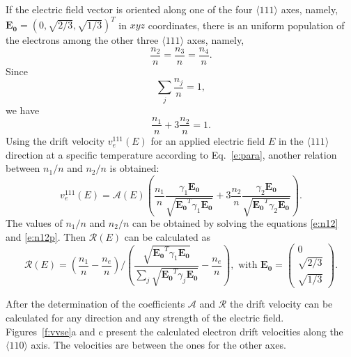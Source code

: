 \documentclass[epj]{svjour}
\begin{document}
If the electric field vector is oriented along one of the four
$\langle 111 \rangle$ axes, namely, $\mathbf{E_{0}} = (0, \sqrt{2/3},
\sqrt{1/3})^{T}$ in $xyz$ coordinates, there is an uniform population
of the electrons among the other three $\langle 111 \rangle$ axes,
namely,
\begin{equation} 
\label{e:n111} 
\frac{n_{2}}{n} = \frac{n_{3}}{n} = \frac{n_{4}}{n}. 
\end{equation} 
Since 
\begin{equation} 
\label{e:nsum} 
\displaystyle \sum_{j}\frac{n_{j}}{n} = 1, 
\end{equation} 
we have 
\begin{equation} 
\label{e:n12} 
\frac{n_{1}}{n} + 3\frac{n_{2}}{n}= 1. 
\end{equation} 
Using the drift velocity $v_{e}^{111}(E)$ for an applied electric
field $E$ in the $\langle 111 \rangle$ direction at a specific
temperature according to Eq.~\ref{e:para}, another relation between
$n_{1}/n$ and $n_{2}/n$ is obtained:
\begin{equation} 
\label{e:n12p} 
v_{e}^{111}(E) =  \mathcal{A}(E) 
\left( \frac{n_{1}}{n} \frac{\gamma_{1}\mathbf{E_{0}}} 
{\sqrt{\mathbf{E_{0}}^{T}\gamma_{1}\mathbf{E_{0}}}} +  
3\frac{n_{2}}{n} \frac{\gamma_{2}\mathbf{E_{0}}}         
{\sqrt{\mathbf{E_{0}}^{T}\gamma_{2}\mathbf{E_{0}}}} \right). 
\end{equation} 
The values of $n_{1}/n$ and $n_{2}/n$ can be obtained by solving the
equations \ref{e:n12} and \ref{e:n12p}. Then $\mathcal{R}(E)$ can be
calculated as
\begin{equation} 
\label{e:re} 
\mathcal{R}(E) = \left( \frac{n_{1}}{n} - \frac{n_{e}}{n} \right) / 
\left( \frac{\sqrt{\mathbf{E_{0}}^{T}\gamma_{1}\mathbf{E_{0}}}} 
{\sum_{j}\sqrt{\mathbf{E_{0}}^{T}\gamma_{j}\mathbf{E_{0}}}} - 
\frac{n_{e}}{n} \right), \mbox{ with } 
\mathbf{E_{0}} = \left( \begin{array}{c}  
0\\ \sqrt{2/3}\\\sqrt{1/3} \end{array} \right). 
\end{equation} 
 
After the determination of the coefficients $\mathcal{A}$ and
$\mathcal{R}$ the drift velocity can be calculated for any direction
and any strength of the electric field. Figures~\ref{f:vvse}a and c
present the calculated electron drift velocities along the $\langle
110 \rangle$ axis. The velocities are between the ones for the other
axes.
 
\end{document}
